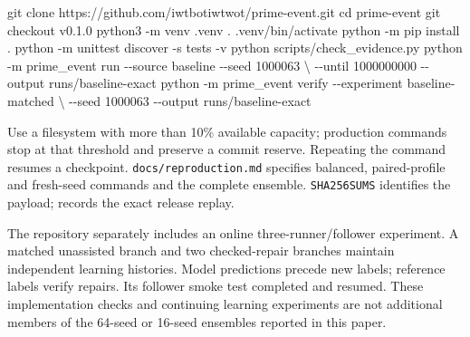 \documentclass[
  11pt,
]{article}
\newenvironment{Shaded}{}{}
\newcommand{\AttributeTok}[1]{\textcolor[rgb]{0.49,0.56,0.16}{#1}}
\newcommand{\BuiltInTok}[1]{\textcolor[rgb]{0.00,0.50,0.00}{#1}}
\newcommand{\DataTypeTok}[1]{\textcolor[rgb]{0.56,0.13,0.00}{#1}}
\newcommand{\ExtensionTok}[1]{#1}
\newcommand{\FunctionTok}[1]{\textcolor[rgb]{0.02,0.16,0.49}{#1}}
\newcommand{\NormalTok}[1]{#1}
\begin{document}
\begin{Shaded}
\begin{Highlighting}[]
\FunctionTok{git}\NormalTok{ clone https://github.com/iwtbotiwtwot/prime{-}event.git}
\BuiltInTok{cd}\NormalTok{ prime{-}event}
\FunctionTok{git}\NormalTok{ checkout v0.1.0}
\ExtensionTok{python3} \AttributeTok{{-}m}\NormalTok{ venv .venv}
\BuiltInTok{.}\NormalTok{ .venv/bin/activate}
\ExtensionTok{python} \AttributeTok{{-}m}\NormalTok{ pip install .}
\ExtensionTok{python} \AttributeTok{{-}m}\NormalTok{ unittest discover }\AttributeTok{{-}s}\NormalTok{ tests }\AttributeTok{{-}v}
\ExtensionTok{python}\NormalTok{ scripts/check\_evidence.py}
\ExtensionTok{python} \AttributeTok{{-}m}\NormalTok{ prime\_event run }\AttributeTok{{-}{-}source}\NormalTok{ baseline }\AttributeTok{{-}{-}seed}\NormalTok{ 1000063 }\DataTypeTok{\textbackslash{}}
  \AttributeTok{{-}{-}until}\NormalTok{ 1000000000 }\AttributeTok{{-}{-}output}\NormalTok{ runs/baseline{-}exact}
\ExtensionTok{python} \AttributeTok{{-}m}\NormalTok{ prime\_event verify }\AttributeTok{{-}{-}experiment}\NormalTok{ baseline{-}matched }\DataTypeTok{\textbackslash{}}
  \AttributeTok{{-}{-}seed}\NormalTok{ 1000063 }\AttributeTok{{-}{-}output}\NormalTok{ runs/baseline{-}exact}
\end{Highlighting}
\end{Shaded}

Use a filesystem with more than 10\% available capacity; production
commands stop at that threshold and preserve a commit reserve. Repeating
the command resumes a checkpoint. \texttt{docs/reproduction.md}
specifies balanced, paired-profile and fresh-seed commands and the
complete ensemble. \texttt{SHA256SUMS} identifies the payload;
\texttt{} records the exact release
replay.

The repository separately includes an online three-runner/follower
experiment. A matched unassisted branch and two checked-repair branches
maintain independent learning histories. Model predictions precede new
labels; reference labels verify repairs. Its follower smoke test
completed and resumed. These implementation checks and continuing
learning experiments are not additional members of the 64-seed or
16-seed ensembles reported in this paper.
\end{document}
